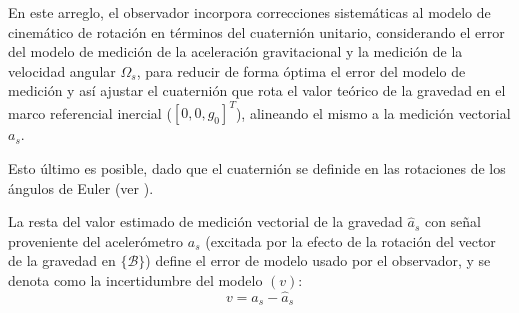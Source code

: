 \documentclass[conference]{IEEEtran}
\newcommand{\marco}[1]{\{\mathcal{#1}\}}
\begin{document}
En este arreglo, el observador incorpora correcciones sistemáticas al modelo de cinemático de rotación en términos del cuaternión unitario, considerando el error del modelo de medición de la aceleración gravitacional y la medición de la velocidad angular $\Omega_s$, para reducir de forma óptima el  error del modelo de medición y así ajustar el cuaternión que rota el valor teórico de la gravedad en el marco referencial inercial ($[0,0,g_0]^T$), alineando el mismo a la medición vectorial $a_s$.\par
Esto último es posible, dado que el cuaternión se definide en las rotaciones de los ángulos de Euler (ver \cite{Altmann1986}).\par
La resta del valor estimado de medición vectorial de la gravedad $\hat{a}_s$ con señal proveniente del acelerómetro $a_s$ (excitada por la efecto de la rotación del vector de la gravedad en $\marco{B}$) define el error de modelo usado por el observador, y se denota como la incertidumbre del modelo $(v)$:
\begin{equation}
v=a_s-\hat{a}_s
\end{equation}
\end{document}
